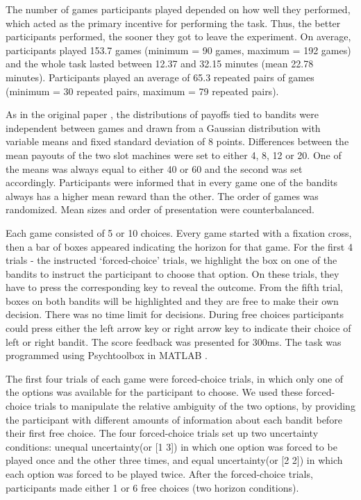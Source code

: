 \documentclass[12pt]{article}
\begin{document}
{The number of games participants played depended on how well they performed, which acted as the primary incentive for performing the task. Thus, the better participants performed, the sooner they got to leave the experiment. On average, participants played 153.7 games (minimum = 90 games, maximum = 192 games) and the whole task lasted between 12.37 and 32.15 minutes (mean 22.78 minutes). Participants played an average of 65.3 repeated pairs of games (minimum = 30 repeated pairs, maximum =  79 repeated pairs).

As in the original paper \citep{wilson2014}, the distributions of payoffs tied to bandits were independent between games and drawn from a Gaussian distribution with variable means and fixed standard deviation of 8 points. Differences between the mean payouts of the two slot machines were set to either 4, 8, 12 or 20. One of the means was always equal to either 40 or 60 and the second was set accordingly. Participants were informed that in every game one of the bandits always has a higher mean reward than the other. The order of games was randomized. Mean sizes and order of presentation were counterbalanced. 

Each game consisted of 5 or 10 choices. Every game started with a fixation cross, then a bar of boxes appeared indicating the horizon for that game. For the first 4 trials - the instructed `forced-choice' trials, we highlight the box on one of the bandits to instruct the participant to choose that option. On these trials, they have to press the corresponding key to reveal the outcome. From the fifth trial, boxes on both bandits will be highlighted and they are free to make their own decision. There was no time limit for decisions. During free choices participants could press either the left arrow key or right arrow key to indicate their choice of left or right bandit. The score feedback was presented for 300ms. The task was programmed using Psychtoolbox in MATLAB \citep{psychtoolbox1, psychtoolbox2}. 

The first four trials of each game were forced-choice trials, in which only one of the options was available for the participant to choose. We used these forced-choice trials to manipulate the relative ambiguity of the two options, by providing the participant with different amounts of information about each bandit before their first free choice. The four forced-choice trials set up two uncertainty conditions: unequal uncertainty(or [1 3]) in which one option was forced to be played once and the other three times, and equal uncertainty(or [2 2]) in which each option was forced to be played twice. After the forced-choice trials, participants made either 1 or 6 free choices (two horizon conditions).

}
\end{document}
